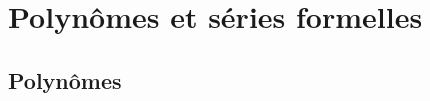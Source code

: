 \documentclass[12pt,a4paper]{book}
\makeatletter
\theoremstyle{definition}
\newcommand\extraspace{
	\vspace{0.25em}
}
\newcommand\whyprefix[2]{%
	\textbf{\prefix{#1}}-#2%
}
\newcommand\mwhyprefix[2]{%
	\texttt{#1 = #1-#2}%
}
\newcommand\prefix[1]{%
	\texttt{#1}%
}
\newcommand\inenglish{\@ifstar{\@inenglish@star}{\@inenglish@no@star}}
\newcommand\@inenglish@star[1]{%
	\emph{\og #1 \fg}%
}
\newcommand\@inenglish@no@star[1]{%
	\@inenglish@star{#1} en anglais%
}
\makeatother
\begin{document}
{{%
%
%
%
%
%
%
%
%
%
%
%
%
%
%
%
%
%
%
%
%
%
%
%
%
%
%
%
%
%
%
%
%


\section{Polynômes et séries formelles}

\subsection{Polynômes}




}}
\end{document}

